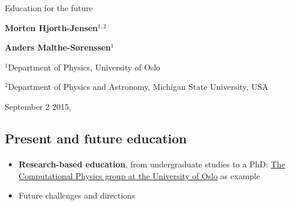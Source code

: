 \documentclass[%
twoside,                 %
final,                   %
10pt]{article}
\begin{document}






\thispagestyle{empty}

\begin{center}
{\LARGE\bf
\begin{spacing}{1.25}
Education for the future
\end{spacing}
}
\end{center}


\begin{center}
{\bf Morten Hjorth-Jensen${}^{1, 2}$} \\ [0mm]
\end{center}

    
\begin{center}
{\bf Anders Malthe-Sørenssen${}^{1}$} \\ [0mm]
\end{center}

    \begin{center}
\centerline{{\small ${}^1$Department of Physics, University of Oslo}}
\centerline{{\small ${}^2$Department of Physics and Astronomy, Michigan State University, USA}}
\end{center}
    

\begin{center} %
September 2 2015,
\end{center}

\vspace{1cm}


\subsection*{Present and future education}

\paragraph{}

\begin{itemize}
\item \textbf{Research-based education}, from undergraduate studies to a PhD: \href{{http://www.mn.uio.no/fysikk/english/research/groups/computational/index.html}}{The Computational Physics group at the University of Oslo} as example

\item Future challenges and directions
\end{itemize}
\end{document}
